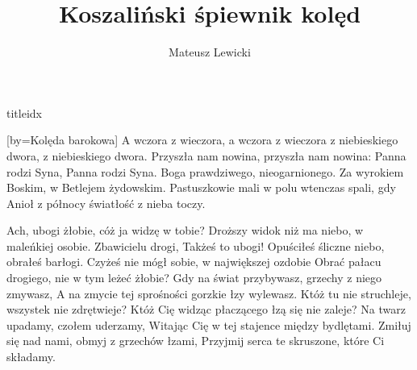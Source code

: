 \documentclass[a5paper, portrait, 12pt]{mwart}
\begin{document}
\author{Mateusz Lewicki}
\title{Koszaliński śpiewnik kolęd}
%

\thispagestyle{empty}

\newpage\null\thispagestyle{empty}\newpage

\clearpage
\setcounter{page}{1}
\begin{songs}{titleidx}



 [by={Kolęda barokowa}]
\beginverse
A wczora z wieczora, a wczora z wieczora
z niebieskiego dwora, z niebieskiego dwora.
Przyszła nam nowina, przyszła nam nowina:
Panna rodzi Syna, Panna rodzi Syna.
\endverse
\beginverse
Boga prawdziwego,
nieogarnionego.
Za wyrokiem Boskim,
w Betlejem żydowskim.
\endverse
\beginverse
Pastuszkowie mali
w polu wtenczas spali,
gdy Anioł z północy
światłość z nieba toczy.
\endverse
\endsong



\beginverse
Ach, ubogi żłobie, cóż ja widzę w tobie?
Droższy widok niż ma niebo, w maleńkiej osobie. 
\endverse
\beginverse
Zbawicielu drogi, Takżeś to ubogi!
Opuściłeś śliczne niebo, obrałeś barłogi.
\endverse
\beginverse
Czyżeś nie mógł sobie, w największej ozdobie
Obrać pałacu drogiego, nie w tym leżeć żłobie?
\endverse
\beginverse
Gdy na świat przybywasz, grzechy z niego zmywasz,
A na zmycie tej sprośności gorzkie łzy wylewasz.
\endverse
\beginverse
Któż tu nie struchleje, wszystek nie zdrętwieje?
Któż Cię widząc płaczącego łzą się nie zaleje?
\endverse
\beginverse
Na twarz upadamy, czołem uderzamy,
Witając Cię w tej stajence między bydlętami.
\endverse
\beginverse
Zmiłuj się nad nami, obmyj z grzechów łzami,
Przyjmij serca te skruszone, które Ci składamy.
\endverse
\endsong


\end{songs}
\end{document}
